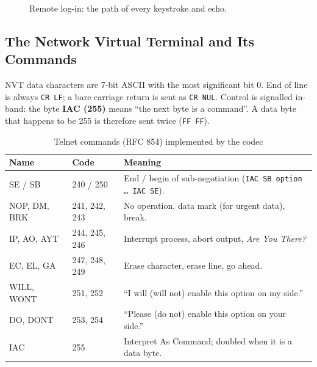 \documentclass[11pt,a4paper]{article}
\begin{document}
\begin{figure}[H]
\centering
{}
\caption{Remote log-in: the path of every keystroke and echo.}
\end{figure}

\subsection{The Network Virtual Terminal and Its Commands}
NVT data characters are 7-bit ASCII with the most significant bit 0. End of line is always \texttt{CR LF}; a bare carriage return is sent as \texttt{CR NUL}. Control is signalled in-band: the byte \textbf{IAC (255)} means ``the next byte is a command''. A data byte that happens to be 255 is therefore sent twice (\texttt{FF FF}).

\begin{table}[H]
\centering
\caption{Telnet commands (RFC 854) implemented by the codec}
\small
\begin{tabularx}{\textwidth}{@{}llY@{}}
\toprule
\textbf{Name} & \textbf{Code} & \textbf{Meaning} \\ \midrule
SE / SB & 240 / 250 & End / begin of sub-negotiation (\texttt{IAC SB option \ldots{} IAC SE}). \\
NOP, DM, BRK & 241, 242, 243 & No operation, data mark (for urgent data), break. \\
IP, AO, AYT & 244, 245, 246 & Interrupt process, abort output, \emph{Are You There?} \\
EC, EL, GA & 247, 248, 249 & Erase character, erase line, go ahead. \\
WILL, WONT & 251, 252 & ``I will (will not) enable this option on my side.'' \\
DO, DONT & 253, 254 & ``Please (do not) enable this option on your side.'' \\
IAC & 255 & Interpret As Command; doubled when it is a data byte. \\ \bottomrule
\end{tabularx}
\end{table}
\end{document}
